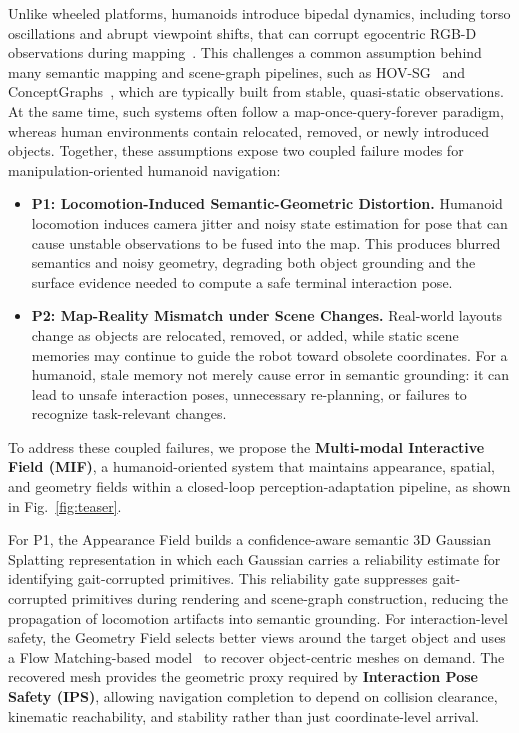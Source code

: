 \documentclass[conference]{IEEEtran}
\begin{document}
%
Unlike wheeled platforms, humanoids introduce bipedal dynamics, including torso oscillations and abrupt viewpoint shifts, that can corrupt egocentric RGB-D observations during mapping~\cite{stasse2006real, kajita20013d}.
%
This challenges a common assumption behind many semantic mapping and scene-graph pipelines, such as HOV-SG~\cite{Werby-RSS-24} and ConceptGraphs~\cite{gu2024conceptgraphs}, which are typically built from stable, quasi-static observations.
%
At the same time, such systems often follow a map-once-query-forever paradigm, whereas human environments contain relocated, removed, or newly introduced objects.
%
Together, these assumptions expose two coupled failure modes for manipulation-oriented humanoid navigation:
%
\begin{itemize}
    \item \textbf{P1: Locomotion-Induced Semantic-Geometric Distortion.} 
    Humanoid locomotion induces camera jitter and noisy state estimation for pose that can cause unstable observations to be fused into the map.
    This produces blurred semantics and noisy geometry, degrading both object grounding and the surface evidence needed to compute a safe terminal interaction pose.    
    \item \textbf{P2: Map-Reality Mismatch under Scene Changes.} 
    Real-world layouts change as objects are relocated, removed, or added, while static scene memories may continue to guide the robot toward obsolete coordinates.
    For a humanoid, stale memory not merely cause error in semantic grounding: it can lead to unsafe interaction poses, unnecessary re-planning, or failures to recognize task-relevant changes.
\end{itemize}

%
To address these coupled failures, we propose the \textbf{Multi-modal Interactive Field (MIF)}, a humanoid-oriented system that maintains appearance, spatial, and geometry fields within a closed-loop perception-adaptation pipeline, as shown in Fig.~\ref{fig:teaser}.

%
For P1, the Appearance Field builds a confidence-aware semantic 3D Gaussian Splatting representation in which each Gaussian carries a reliability estimate for identifying gait-corrupted primitives.
%
This reliability gate suppresses gait-corrupted primitives during rendering and scene-graph construction, reducing the propagation of locomotion artifacts into semantic grounding.
%
For interaction-level safety, the Geometry Field selects better views around the target object and uses a Flow Matching-based model~\cite{chen2025sam, lipman2022flow} to recover object-centric meshes on demand.
%
The recovered mesh provides the geometric proxy required by \textbf{Interaction Pose Safety (IPS)}, allowing navigation completion to depend on collision clearance, kinematic reachability, and stability rather than just coordinate-level arrival.
\end{document}
